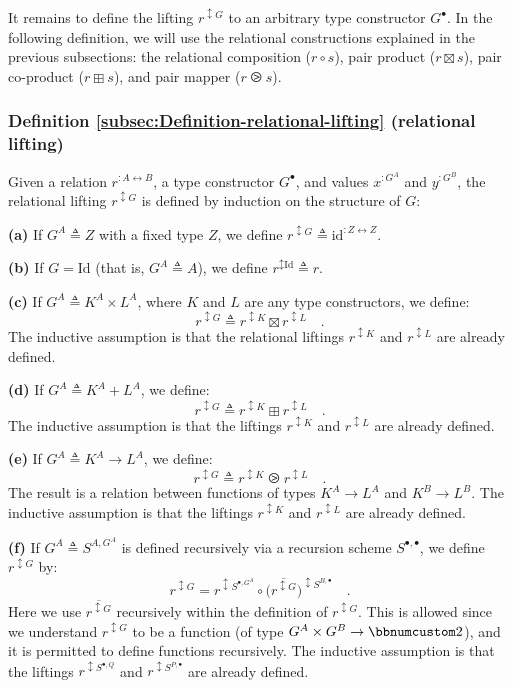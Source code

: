 It remains to define the lifting $r^{\updownarrow G}$ to an arbitrary
type constructor $G^{\bullet}$. In the following definition, we will
use the relational constructions explained in the previous subsections:
the relational composition ($r\circ s$), pair product ($r\boxtimes s$),
pair co-product ($r\boxplus s$), and pair mapper ($r\ogreaterthan s$).

\subsubsection{Definition \label{subsec:Definition-relational-lifting}\ref{subsec:Definition-relational-lifting}
(relational lifting)}

Given a relation $r^{:A\leftrightarrow B}$, a type constructor $G^{\bullet}$,
and values $x^{:G^{A}}$ and $y^{:G^{B}}$, the relational lifting
$r^{\updownarrow G}$ is defined by induction on the structure of
$G$:

\textbf{(a)} If $G^{A}\triangleq Z$ with a fixed type $Z$, we define
$r^{\updownarrow G}\triangleq\text{id}^{:Z\leftrightarrow Z}$.

\textbf{(b)} If $G=\text{Id}$ (that is, $G^{A}\triangleq A$), we
define $r^{\updownarrow\text{Id}}\triangleq r$. 

\textbf{(c)} If $G^{A}\triangleq K^{A}\times L^{A}$, where $K$ and
$L$ are any type constructors, we define: 
\[
r^{\updownarrow G}\triangleq r^{\updownarrow K}\boxtimes r^{\updownarrow L}\quad.
\]
The inductive assumption is that the relational liftings $r^{\updownarrow K}$
and $r^{\updownarrow L}$ are already defined.

\textbf{(d)} If $G^{A}\triangleq K^{A}+L^{A}$, we define: 
\[
r^{\updownarrow G}\triangleq r^{\updownarrow K}\boxplus r^{\updownarrow L}\quad.
\]
The inductive assumption is that the liftings $r^{\updownarrow K}$
and $r^{\updownarrow L}$ are already defined.

\textbf{(e)} If $G^{A}\triangleq K^{A}\rightarrow L^{A}$, we define:
\[
r^{\updownarrow G}\triangleq r^{\updownarrow K}\ogreaterthan r^{\updownarrow L}\quad.
\]
The result is a relation between functions of types $K^{A}\rightarrow L^{A}$
and $K^{B}\rightarrow L^{B}$. The inductive assumption is that the
liftings $r^{\updownarrow K}$ and $r^{\updownarrow L}$ are already
defined.

\textbf{(f)} If $G^{A}\triangleq S^{A,G^{A}}$ is defined recursively
via a recursion scheme $S^{\bullet,\bullet}$, we define $r^{\updownarrow G}$
by:
\[
r^{\updownarrow G}=r^{\updownarrow S^{\bullet,G^{A}}}\circ\big(\overline{r^{\updownarrow G}}\big)^{\updownarrow S^{B,\bullet}}\quad.
\]
Here we use $\overline{r^{\updownarrow G}}$ recursively within the
definition of $r^{\updownarrow G}$. This is allowed since we understand
$r^{\updownarrow G}$ to be a function (of type $G^{A}\times G^{B}\rightarrow\bbnum 2$),
and it is permitted to define functions recursively. The inductive
assumption is that the liftings $r^{\updownarrow S^{\bullet,Q}}$
and $r^{\updownarrow S^{P,\bullet}}$ are already defined. 

